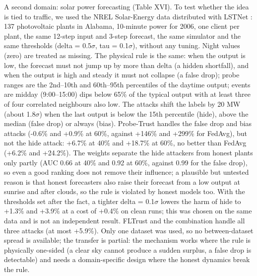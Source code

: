 \documentclass[journal]{IEEEtran}
\begin{document}
A second domain: solar power forecasting (Table XVI). To test whether the idea is tied to traffic, we used the NREL Solar-Energy data distributed with LSTNet \cite{lstnet}: 137 photovoltaic plants in Alabama, 10-minute power for 2006, one client per plant, the same 12-step input and 3-step forecast, the same simulator and the same thresholds (delta = 0.5\ensuremath{\sigma}, tau = 0.1\ensuremath{\sigma}), without any tuning. Night values (zero) are treated as missing. The physical rule is the same: when the output is low, the forecast must not jump up by more than delta (a hidden shortfall), and when the output is high and steady it must not collapse (a false drop); probe ranges are the 2nd--10th and 60th--95th percentiles of the daytime output; events are midday (9:00--15:00) dips below 65\% of the typical output with at least three of four correlated neighbours also low. The attacks shift the labels by 20 MW (about 1.8\ensuremath{\sigma}) when the last output is below the 15th percentile (hide), above the median (false drop) or always (bias). Probe-Trust handles the false drop and bias attacks (-0.6\% and +0.9\% at 60\%, against +146\% and +299\% for FedAvg), but not the hide attack: +6.7\% at 40\% and +18.7\% at 60\%, no better than FedAvg (+6.2\% and +24.2\%). The weights separate the hide attackers from honest plants only partly (AUC 0.66 at 40\% and 0.92 at 60\%, against 0.99 for the false drop), so even a good ranking does not remove their influence; a plausible but untested reason is that honest forecasters also raise their forecast from a low output at sunrise and after clouds, so the rule is violated by honest models too. With the thresholds set after the fact, a tighter delta = 0.1\ensuremath{\sigma} lowers the harm of hide to +1.3\% and +3.9\% at a cost of +0.4\% on clean runs; this was chosen on the same data and is not an independent result. FLTrust and the combination handle all three attacks (at most +5.9\%). Only one dataset was used, so no between-dataset spread is available; the transfer is partial: the mechanism works where the rule is physically one-sided (a clear sky cannot produce a sudden surplus, a false drop is detectable) and needs a domain-specific design where the honest dynamics break the rule.
\end{document}
